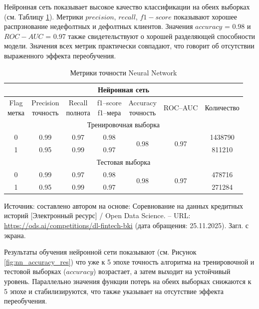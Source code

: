 Нейронная сеть показывает высокое качество классификации на обеих выборках (см. Таблицу \ref{nn_final_res}). Метрики $precision$, $recall$, $f1-score$ показывают хорошее распрзнование недефолтных и дефолтных клиентов. Значения $accuracy$ = 0.98 и $ROC-AUC$ = 0.97 также свидетельствуют о хорошей разделяющей способности модели. Значения всех метрик практически совпадают, что говорит об отсутствии выраженного эффекта переобучения.

\newpage
\begin{center}
	\begin{longtable}{|c|c|c|c|c|c|c|}
		\caption{Метрики точности Neural Network}
		\label{nn_final_res} \\
		\hline
		\multicolumn{7}{|c|}{Нейронная сеть}\\
		\hline
		\rowcolor[gray]{.9}
		\specialcell{Flag\\метка} &
		\specialcell{Precision\\точность} &
		\specialcell{Recall\\полнота} &
		\specialcell{f1--score\\f1--мера} &
		\specialcell{Accuracy\\точность}  &
		ROC--AUC &
		Количество    \\
		\hline
		\multicolumn{7}{|c|}{Тренировочная выборка}\\
		\hline
		0 & 0.99 & 0.97 & 0.98 &
		\multirow{2}{*}{0.98} &   
		\multirow{2}{*}{0.97} &  
		1438790\\                    
		\cline{1-4} \cline{7-7}
		1 & 0.95 & 0.99 & 0.97 &  
		&      & 811210 \\       
		\hline
		\multicolumn{7}{|c|}{Тестовая выборка} \\
		\hline
		0 & 0.99 & 0.97 & 0.98 &
		\multirow{2}{*}{0.98} &
		\multirow{2}{*}{0.97} &
		478716 \\
		\cline{1-4} \cline{7-7}
		1 & 0.95 & 0.99 & 0.97 & & & 271284 \\
		\hline
	\end{longtable}
	\begin{minipage}{\textwidth}
		\fontsize{9}{11}\selectfont
		\justifying
		Источник: составлено автором на основе: Соревнование на данных кредитных историй [Электронный ресурс] / Open Data Science. -- URL: \url{https://ods.ai/competitions/dl-fintech-bki} (дата обращения: 25.11.2025). Загл. с экрана.
	\end{minipage}
\end{center}

Результаты обучения нейронной сети показывают (см. Рисунок \ref{fig:nn_accuracy_res}) что уже к 5 эпохе точность алгоритма на тренировочной и тестовой выборках ($accuracy$) возрастает, а затем выходит на устойчивый уровень. Параллельно значения функции потерь на обеих выборках снижаются к 5 эпохе и стабилизируются, что также указывает на отсутствие эффекта переобучения.

